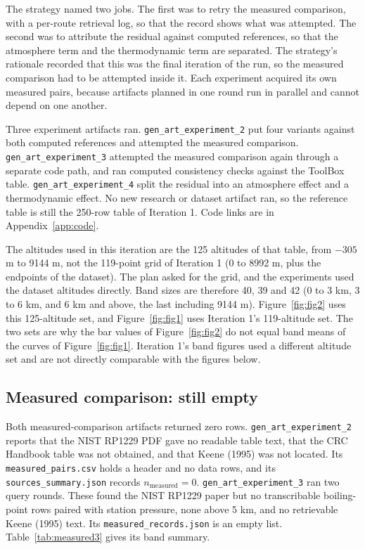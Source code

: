 \documentclass[11pt,letterpaper]{article}
\begin{document}
The strategy named two jobs. The first was to retry the measured comparison, with a per-route retrieval log, so that the record shows what was attempted. The second was to attribute the residual against computed references, so that the atmosphere term and the thermodynamic term are separated. The strategy's rationale recorded that this was the final iteration of the run, so the measured comparison had to be attempted inside it. Each experiment acquired its own measured pairs, because artifacts planned in one round run in parallel and cannot depend on one another.

Three experiment artifacts ran. \texttt{gen\_art\_experiment\_2} put four variants against both computed references and attempted the measured comparison. \texttt{gen\_art\_experiment\_3} attempted the measured comparison again through a separate code path, and ran computed consistency checks against the ToolBox table. \texttt{gen\_art\_experiment\_4} split the residual into an atmosphere effect and a thermodynamic effect. No new research or dataset artifact ran, so the reference table is still the 250-row table of Iteration 1. Code links are in Appendix~\ref{app:code}.

The altitudes used in this iteration are the 125 altitudes of that table, from $-305$ m to 9144 m, not the 119-point grid of Iteration 1 (0 to 8992 m, plus the endpoints of the dataset). The plan asked for the grid, and the experiments used the dataset altitudes directly. Band sizes are therefore 40, 39 and 42 (0 to 3 km, 3 to 6 km, and 6 km and above, the last including 9144 m). Figure~\ref{fig:fig2} uses this 125-altitude set, and Figure~\ref{fig:fig1} uses Iteration 1's 119-altitude set. The two sets are why the bar values of Figure~\ref{fig:fig2} do not equal band means of the curves of Figure~\ref{fig:fig1}. Iteration 1's band figures used a different altitude set and are not directly comparable with the figures below.

\subsection{Measured comparison: still empty}

Both measured-comparison artifacts returned zero rows. \texttt{gen\_art\_experiment\_2} reports that the NIST RP1229 PDF gave no readable table text, that the CRC Handbook table was not obtained, and that Keene (1995) was not located. Its \texttt{measured\_pairs.csv} holds a header and no data rows, and its \texttt{sources\_summary.json} records $n_\mathrm{measured} = 0$. \texttt{gen\_art\_experiment\_3} ran two query rounds. These found the NIST RP1229 paper but no transcribable boiling-point rows paired with station pressure, none above 5 km, and no retrievable Keene (1995) text. Its \texttt{measured\_records.json} is an empty list. Table~\ref{tab:measured3} gives its band summary.
\end{document}

